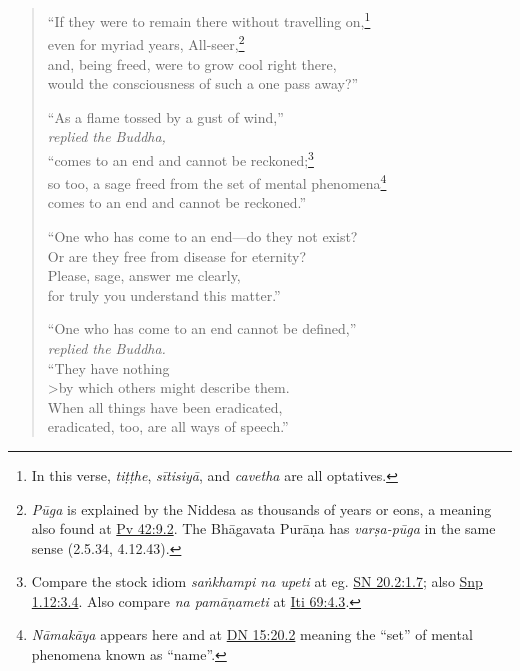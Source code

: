 \documentclass[12pt,openany]{book}%
\newcommand*{\scspeaker}[1]{\hspace{2em}\textit{#1}}
\begin{document}
\begin{verse}
“If they were to remain there without travelling on,\footnote{In this verse, \textit{\textsanskrit{tiṭṭhe}}, \textit{\textsanskrit{sītisiyā}}, and \textit{cavetha} are all optatives. } \\
even for myriad years, All-seer,\footnote{\textit{\textsanskrit{Pūga}} is explained by the Niddesa as thousands of years or eons, a meaning also found at \href{https://suttacentral.net/pv42/en/sujato\#9.2}{Pv 42:9.2}. The \textsanskrit{Bhāgavata} \textsanskrit{Purāṇa} has \textit{\textsanskrit{varṣa}-\textsanskrit{pūga}} in the same sense (2.5.34, 4.12.43). } \\
and, being freed, were to grow cool right there, \\
would the consciousness of such a one pass away?” 

“As a flame tossed by a gust of wind,” \\
\scspeaker{replied the Buddha, }\\
“comes to an end and cannot be reckoned;\footnote{Compare the stock idiom \textit{\textsanskrit{saṅkhampi} na upeti} at eg. \href{https://suttacentral.net/sn20.2/en/sujato\#1.7}{SN 20.2:1.7}; also \href{https://suttacentral.net/snp1.12/en/sujato\#3.4}{Snp 1.12:3.4}. Also compare \textit{na \textsanskrit{pamāṇameti}} at \href{https://suttacentral.net/iti69/en/sujato\#4.3}{Iti 69:4.3}. } \\
so too, a sage freed from the set of mental phenomena\footnote{\textit{\textsanskrit{Nāmakāya}} appears here and at \href{https://suttacentral.net/dn15/en/sujato\#20.2}{DN 15:20.2} meaning the “set” of mental phenomena known as “name”. } \\
comes to an end and cannot be reckoned.” 

“One who has come to an end—do they not exist? \\
Or are they free from disease for eternity? \\
Please, sage, answer me clearly, \\
for truly you understand this matter.” 

“One who has come to an end cannot be defined,” \\
\scspeaker{replied the Buddha. }\\
“They have nothing \\>by which others might describe them. \\
When all things have been eradicated, \\
eradicated, too, are all ways of speech.” 

%
\end{verse}
\end{document}
